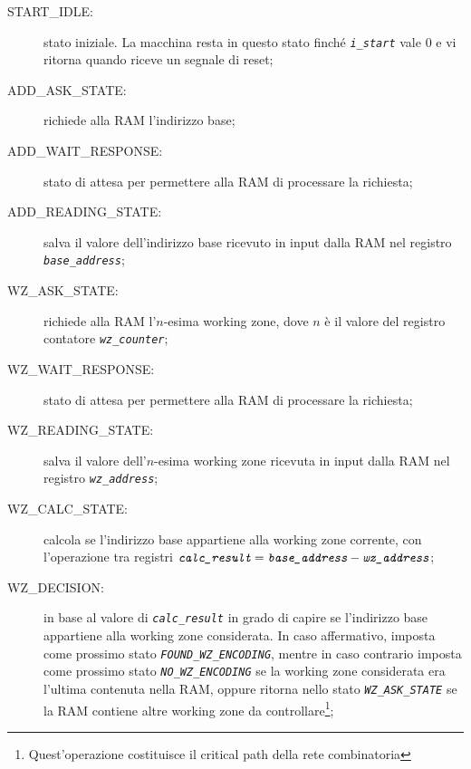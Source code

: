 \documentclass[12pt,a4paper,titlepage]{article}
\begin{document}
		\renewcommand{\descriptionlabel}[1]{\hspace{\labelsep}\textit{#1}}
		\begin{description}
		\item[START\_IDLE:] stato iniziale. La macchina resta in questo stato finché \textit{\texttt{i\_start}} vale $0$ e vi ritorna quando riceve un segnale di reset;
		\item[ADD\_ASK\_STATE:]		richiede alla RAM l'indirizzo base;
		\item[ADD\_WAIT\_RESPONSE:]	stato di attesa per permettere alla RAM di processare la richiesta;
		\item[ADD\_READING\_STATE:]	salva il valore dell'indirizzo base ricevuto in input dalla RAM nel registro
									\textit{\texttt{base\_address}};
		\item[WZ\_ASK\_STATE:]			richiede alla RAM l'$n$-esima working zone, dove $n$ è il valore del registro contatore
									\textit{\texttt{wz\_counter}};
		\item[WZ\_WAIT\_RESPONSE:]		stato di attesa per permettere alla RAM di processare la richiesta;
		\item[WZ\_READING\_STATE:]		salva il valore dell'$n$-esima working zone ricevuta in input dalla RAM nel registro
									\textit{\texttt{wz\_address}};
		\item[WZ\_CALC\_STATE:]		calcola se l'indirizzo base appartiene alla working zone corrente, con l'operazione tra registri $\textit{\texttt{calc\_result}} = \textit{\texttt{base\_address}} - \textit{\texttt{wz\_address}}$;
		\item[WZ\_DECISION:]		in base al valore di \textit{\texttt{calc\_result}}  in grado di capire se l'indirizzo base appartiene alla working zone considerata. In caso affermativo, imposta come prossimo stato \textit{\texttt{FOUND\_WZ\_ENCODING}}, mentre in caso contrario imposta come prossimo stato \textit{\texttt{NO\_WZ\_ENCODING}} se la working zone considerata era l'ultima contenuta nella RAM, oppure ritorna nello stato \textit{\texttt{WZ\_ASK\_STATE}} se la RAM contiene altre working zone da controllare\footnote{Quest'operazione costituisce il critical path della rete combinatoria}; %
		

\end{description}
\end{document}
